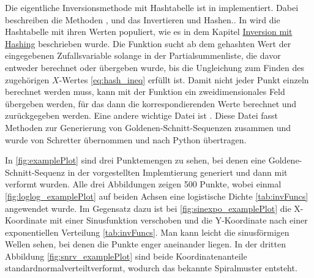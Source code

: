 Die eigentliche Inversionsmethode mit Hashtabelle ist in  
implementiert. Dabei beschreiben die Methoden ,  und  
das Invertieren und Hashen.. In  wird die Hashtabelle mit ihren 
Werten populiert, wie es in dem Kapitel \hyperref[funktion_invhashing]{Inversion mit Hashing} 
beschrieben wurde. Die Funktion  sucht ab dem gehashten Wert der 
eingegebenen Zufallsvariable solange in der Partialsummenliste, die davor entweder berechnet 
oder übergeben wurde, bis die Ungleichung zum Finden des zugehörigen $X$-Wertes \eqref{eq:hash_ineq} 
erfüllt ist. Damit nicht jeder Punkt einzeln berechnet werden muss, kann mit der Funktion 
 ein zweidimensionales Feld übergeben werden, für das dann die korrespondierenden 
Werte berechnet und zurückgegeben werden. Eine andere wichtige Datei ist . 
Diese Datei fasst Methoden zur Generierung von Goldenen-Schnitt-Sequenzen zusammen und wurde 
von Schretter übernommen und nach Python übertragen. 

In \ref{fig:examplePlot} sind drei Punktemengen zu sehen, bei denen eine Goldene-Schnitt-Sequenz 
in der vorgestellten Implemtierung generiert und dann mit  verformt wurden. 
Alle drei Abbildungen zeigen 500 Punkte, wobei 
einmal \ref{fig:loglog_examplePlot} auf beiden Achsen eine logistische Dichte 
\ref{tab:invFuncs} angewendet wurde. Im Gegensatz dazu ist bei 
\ref{fig:sinexpo_examplePlot} die X-Koordinate mit einer Sinusfunktion verschoben 
und die Y-Koordinate nach einer exponentiellen Verteilung \ref{tab:invFuncs}. Man 
kann leicht die sinusförmigen Wellen sehen, bei denen die Punkte enger aneinander 
liegen. In der dritten Abbildung \ref{fig:snrv_examplePlot} sind beide 
Koordinatenanteile standardnormalverteiltverformt, wodurch das bekannte Spiralmuster 
entsteht. 